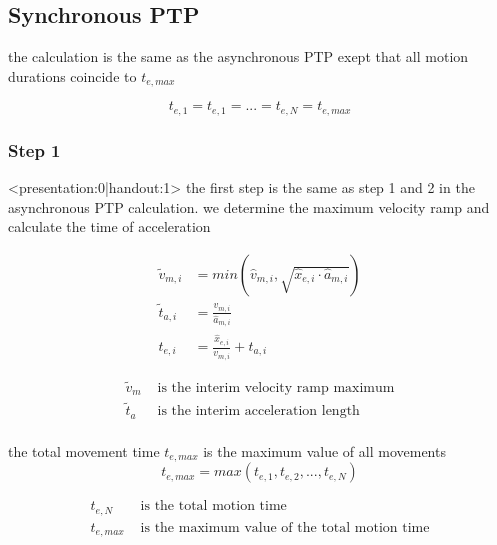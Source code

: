 \documentclass[%
  professionalfonts,%
  xcolor={%
    usenames,%
    dvipsnames,%
    svgnames,%
    table,%
    hyperref%
  }%
]{beamer}
\begin{document}
\subsection{Synchronous PTP}
\begin{frame}
the calculation is the same as the asynchronous PTP
exept that all motion durations coincide to $t_{e,max}$

\begin{equation*}
t_{e,1} = t_{e,1} = ... = t_{e,N} = t_{e,max}
\end{equation*}
\end{frame}

\subsubsection{Step 1}
\begin{frame}<presentation:0|handout:1>
the first step is the same as step 1 and 2 in the asynchronous PTP calculation. we determine the maximum velocity ramp and  calculate the time of acceleration
\end{frame}

\begin{frame}
\begin{align*}
\tilde{v}_{m,i} & = min(\hat{v}_{m,i},\sqrt{\hat{x}_{e,i} \cdot \hat{a}_{m,i}}) \\
\tilde{t}_{a,i} & = \frac{v_{m,i}}{\hat{a}_{m,i}}\\
t_{e,i} & = \frac{\hat{x}_{e,i}}{v_{m,i}} + t_{a,i}
\end{align*}

\begin{align*}
\tilde{v}_{m} & \text{ is the interim velocity ramp maximum}\\
\tilde{t}_{a} & \text{ is the interim acceleration length}\\
\end{align*}                 
\end{frame}

\begin{frame}
the total movement time $t_{e,max}$ is the maximum value of all movements
\begin{equation*}
t_{e,max} = max(t_{e,1},t_{e,2},...,t_{e,N})
\end{equation*}

\begin{align*}
t_{e,N} & \text{ is the total motion time } \\
t_{e,max} & \text{ is the maximum value of the total motion time}      
\end{align*}
\end{frame}
  
\end{document}
